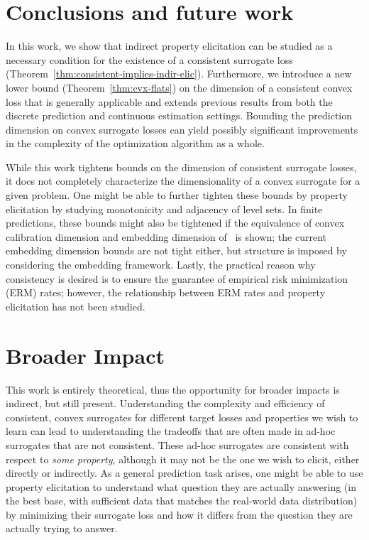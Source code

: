 \documentclass{article}
\begin{document}
\section{Conclusions and future work}\label{sec:conclusions}
In this work, we show that indirect property elicitation can be studied as a necessary condition for the existence of a consistent surrogate loss (Theorem~\ref{thm:consistent-implies-indir-elic}).
Furthermore, we introduce a new lower bound (Theorem~\ref{thm:cvx-flats}) on the dimension of a consistent convex loss that is generally applicable and extends previous results from both the discrete prediction and continuous estimation settings.
Bounding the prediction dimension on convex surrogate losses can yield possibly significant improvements in the complexity of the optimization algorithm as a whole.

While this work tightens bounds on the dimension of consistent surrogate losses, it does not completely characterize the dimensionality of a convex surrogate for a given problem.
One might be able to further tighten these bounds by property elicitation by studying monotonicity and adjacency of level sets.
In finite predictions, these bounds might also be tightened if the equivalence of convex calibration dimension and embedding dimension of~\cite{finocchiaro2020embedding} is shown; the current embedding dimension bounds are not tight either, but structure is imposed by considering the embedding framework.
Lastly, the practical reason why consistency is desired is to ensure the guarantee of empirical risk minimization (ERM) rates; however, the relationship between ERM rates and property elicitation has not been studied.


\newpage

\section*{Broader Impact}
This work is entirely theoretical, thus the opportunity for broader impacts is indirect, but still present.
Understanding the complexity and efficiency of consistent, convex surrogates for different target losses and properties we wish to learn can lead to understanding the tradeoffs that are often made in ad-hoc surrogates that are not consistent.
These ad-hoc surrogates are consistent with respect to \emph{some property}, although it may not be the one we wish to elicit, either directly or indirectly.
As a general prediction task arises, one might be able to use property elicitation to understand what question they are actually answering (in the best base, with sufficient data that matches the real-world data distribution) by minimizing their surrogate loss and how it differs from the question they are actually trying to answer.
\end{document}
